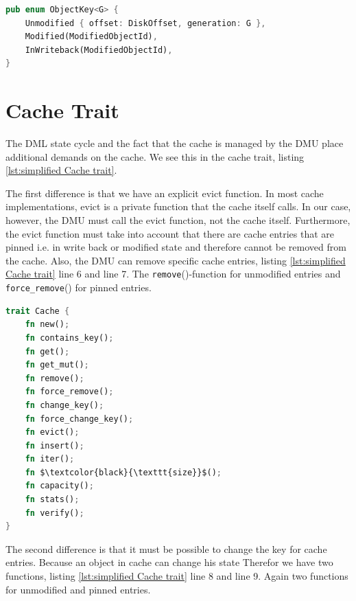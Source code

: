 \documentclass[
	12pt,
	a4paper,
	abstract,
	bibliography=totoc,
	chapterprefix,
	headings=openright,
	numbers=endperiod,
	parskip=half,
	twoside,
]{scrreprt}
\begin{document}
\bigskip

\begin{lstlisting}[language=Rust,mathescape=true,caption=ObjectKey enumeration,label=lst:ObjectKey enumeration]
pub enum ObjectKey<G> {
    Unmodified { offset: DiskOffset, generation: G },
    Modified(ModifiedObjectId),
    InWriteback(ModifiedObjectId),
}
\end{lstlisting}

\bigskip

\section{Cache Trait}

The DML state cycle and the fact that the cache is managed by the DMU place additional demands on the cache.
We see this in the cache trait, listing \ref{lst:simplified Cache trait}.

The first difference is that we have an explicit evict function. In most cache implementations, evict is a private function that the cache itself calls.
In our case, however, the DMU must call the evict function, not the cache itself.
Furthermore, the evict function must take into account that there are cache entries that 
are pinned i.e. in write back or modified state and therefore cannot be removed from the cache.
Also, the DMU can remove specific cache entries, listing  \ref{lst:simplified Cache trait} line 6 and line 7.
The \texttt{remove}()-function for unmodified entries and \texttt{force\_remove}() for pinned entries.

\bigskip

\begin{lstlisting}[language=Rust,mathescape=true,caption={simplified Cache trait without type aliases, generics, function parameters and function return types},label=lst:simplified Cache trait]
trait Cache {
    fn new();
    fn contains_key();
    fn get();
    fn get_mut();
    fn remove();
    fn force_remove();
    fn change_key();
    fn force_change_key();
    fn evict();
    fn insert();
    fn iter();
    fn $\textcolor{black}{\texttt{size}}$();
    fn capacity();
    fn stats();
    fn verify();
}
\end{lstlisting}

The second difference is that it must be possible to change the key for cache entries.
Because an object in cache can change his state 
Therefor we have two functions, listing \ref{lst:simplified Cache trait} line 8 and line 9. 
Again two functions for unmodified and pinned entries.
\end{document}
